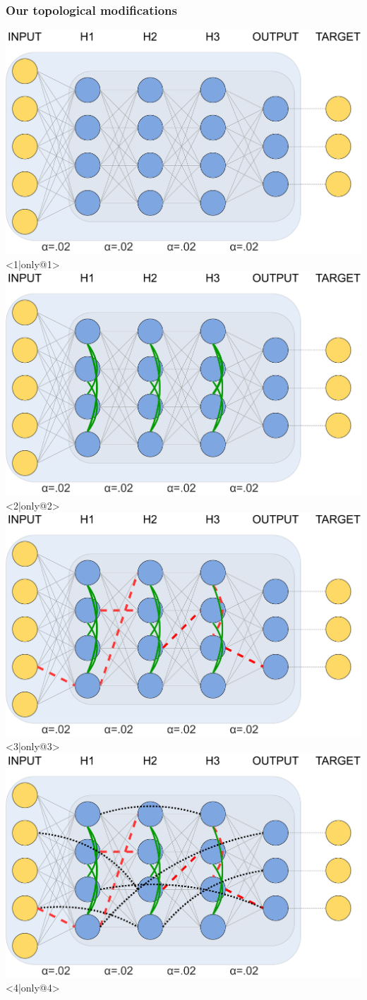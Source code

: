 \documentclass[pdf]{beamer}
\begin{document}
\begin{frame} 
	\frametitle{Our topological modifications}
		\begin{center}
		\includegraphics[width=.8\textwidth]{figures/topology_changes_step1.pdf}<1|only@1>
		\includegraphics[width=.8\textwidth]{figures/topology_changes_step2.pdf}<2|only@2>
		\includegraphics[width=.8\textwidth]{figures/topology_changes_step3.pdf}<3|only@3>
		\includegraphics[width=.8\textwidth]{figures/topology_changes_step4.pdf}<4|only@4>

\end{center}
\end{frame}
\end{document}
